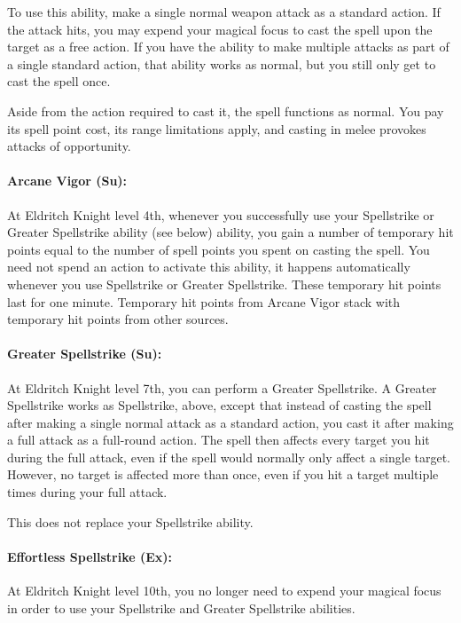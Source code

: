 To use this ability, make a single normal weapon attack as a standard action. If the attack hits, you may expend your magical focus to cast the spell upon the target as a free action. If you have the ability to make multiple attacks as part of a single standard action, that ability works as normal, but you still only get to cast the spell once.

Aside from the action required to cast it, the spell functions as normal. You pay its spell point cost, its range limitations apply, and casting in melee provokes attacks of opportunity.

\paragraph{Arcane Vigor (Su):}
At Eldritch Knight level 4th, whenever you successfully use your Spellstrike or Greater Spellstrike ability (see below) ability, you gain a number of temporary hit points equal to the number of spell points you spent on casting the spell.
You need not spend an action to activate this ability, it happens automatically whenever you use Spellstrike or Greater Spellstrike.
These temporary hit points last for one minute.
Temporary hit points from Arcane Vigor stack with temporary hit points from other sources.

\paragraph{Greater Spellstrike (Su):}
At Eldritch Knight level 7th, you can perform a Greater Spellstrike.
A Greater Spellstrike works as Spellstrike, above, except that instead of casting the spell after making a single normal attack as a standard action, you cast it after making a full attack as a full-round action. The spell then affects every target you hit during the full attack, even if the spell would normally only affect a single target. However, no target is affected more than once, even if you hit a target multiple times during your full attack.

This does not replace your Spellstrike ability.

\paragraph{Effortless Spellstrike (Ex):}
At Eldritch Knight level 10th, you no longer need to expend your magical focus in order to use your Spellstrike and Greater Spellstrike abilities.